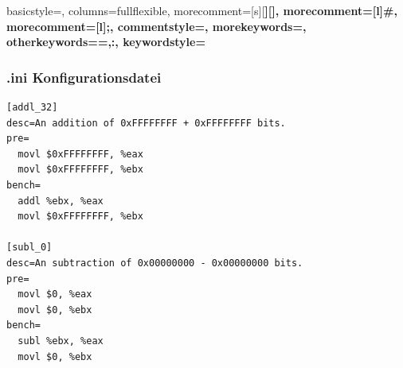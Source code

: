 \documentclass{beamer}
\begin{document}
\begin{frame}[fragile]
{
    basicstyle=\ttfamily\small,
    columns=fullflexible,
    morecomment=[s][\color{blue}\bfseries]{[}{]},
    morecomment=[l]{\#},
    morecomment=[l]{;},
    commentstyle=\color{gray}\ttfamily,
    morekeywords={},
    otherkeywords={=,:},
    keywordstyle={\color{green}\bfseries}
}

\lstset{language=Ini}
\frametitle{.ini Konfigurationsdatei} 

\begin{lstlisting}
[addl_32]
desc=An addition of 0xFFFFFFFF + 0xFFFFFFFF bits.
pre=
  movl $0xFFFFFFFF, %eax
  movl $0xFFFFFFFF, %ebx
bench=
  addl %ebx, %eax
  movl $0xFFFFFFFF, %ebx

[subl_0]
desc=An subtraction of 0x00000000 - 0x00000000 bits.
pre=
  movl $0, %eax
  movl $0, %ebx
bench=
  subl %ebx, %eax
  movl $0, %ebx

\end{lstlisting}
\end{frame}
\end{document}
